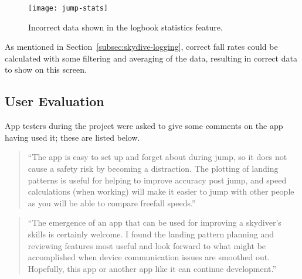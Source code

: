 \begin{figure}[ht]
  \centering
  \texttt{[image: jump-stats]}
  \caption{Incorrect data shown in the logbook statistics feature.}\label{fig:jump-stats}
\end{figure}

As mentioned in Section~\ref{subsec:skydive-logging}, correct fall rates could be calculated with some filtering and averaging of the data, resulting in correct data to show on this screen.

\subsection{User Evaluation}
App testers during the project were asked to give some comments on the app having used it; these are listed below.

\begin{quote}
``The app is easy to set up and forget about during jump, so it does not cause a safety risk by becoming a distraction. The plotting of landing patterns is useful for helping to improve accuracy post jump, and speed calculations (when working) will make it easier to jump with other people as you will be able to compare freefall speeds.''
\end{quote}

\begin{quote}
``The emergence of an app that can be used for improving a skydiver's skills is certainly welcome. I found the landing pattern planning and reviewing features most useful and look forward to what might be accomplished when device communication issues are smoothed out. Hopefully, this app or another app like it can continue development.''
\end{quote}
